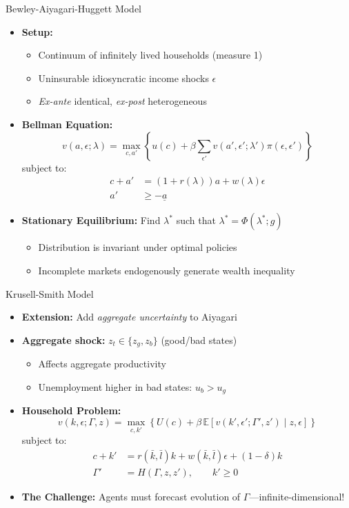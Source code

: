 \begin{frame}{Bewley-Aiyagari-Huggett Model}
\begin{itemize}
\item \textbf{Setup:}
\begin{itemize}
    \item Continuum of infinitely lived households (measure 1)
    \item Uninsurable idiosyncratic income shocks $\epsilon$
    \item \emph{Ex-ante} identical, \emph{ex-post} heterogeneous
\end{itemize}

\medskip
\item \textbf{Bellman Equation:}
\[
v(a,\epsilon;\lambda)=\max_{c,a'}\left\{ u(c)+\beta\sum_{\epsilon'}v(a',\epsilon';\lambda')\pi(\epsilon,\epsilon') \right\}
\]
subject to:
\begin{align*}
c+a' & = (1+r(\lambda))a+w(\lambda)\epsilon \\
a' & \geq -\underline{a}
\end{align*}

\medskip
\item \textbf{Stationary Equilibrium:} Find $\lambda^*$ such that $\lambda^* = \Phi(\lambda^*; g)$
\begin{itemize}
    \item Distribution is invariant under optimal policies
    \item Incomplete markets endogenously generate wealth inequality
\end{itemize}
\end{itemize}
\end{frame}

\begin{frame}{Krusell-Smith Model}
\begin{itemize}
\item \textbf{Extension:} Add \emph{aggregate uncertainty} to Aiyagari

\medskip
\item \textbf{Aggregate shock:} $z_t \in \{z_g, z_b\}$ (good/bad states)
\begin{itemize}
    \item Affects aggregate productivity
    \item Unemployment higher in bad states: $u_b > u_g$
\end{itemize}

\medskip
\item \textbf{Household Problem:}
\[
v(k,\epsilon;\Gamma,z)=\max_{c,k'} \left\{ U(c)+\beta \, \mathbb{E}[v(k',\epsilon';\Gamma',z') \mid z,\epsilon] \right\}
\]
subject to:
\begin{align*}
c+k' &= r(\bar{k},\bar{l})k + w(\bar{k},\bar{l})\epsilon + (1-\delta)k \\
\Gamma' &= H(\Gamma,z,z'), \qquad k' \geq 0
\end{align*}

\medskip
\item \textbf{The Challenge:} Agents must forecast evolution of $\Gamma$---infinite-dimensional!
\end{itemize}
\end{frame}

